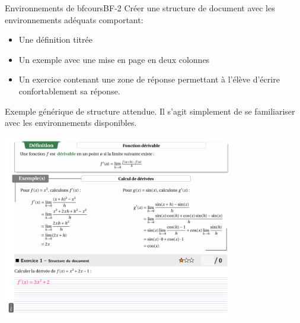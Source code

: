 \begin{EXO}{Environnements de bfcours}{BF-2}
    Créer une structure de document avec les environnements adéquats comportant:
    \begin{itemize}[label=$\bullet$]
        \item Une définition titrée
        \item Un exemple avec une mise en page en deux colonnes
        \item Un exercice contenant une zone de réponse permettant à l'élève d'écrire confortablement sa réponse. 
    \end{itemize}


\exocorrection

	Exemple générique de structure attendue. 
        Il s'agit simplement de se familiariser avec les environnements disponibles. 

        \begin{center}
        \includegraphics[width=0.75\textwidth]{sections/formattage/env/exemple-bidon.png}
        \end{center}
\end{EXO}
